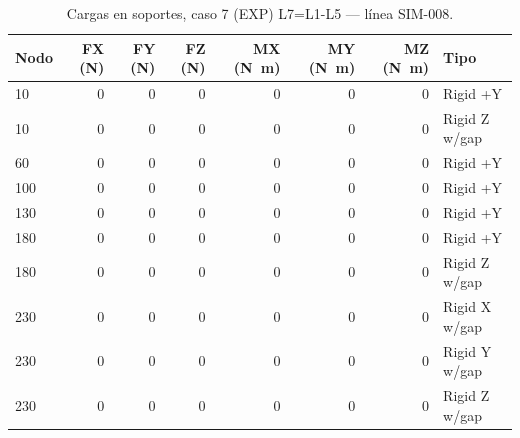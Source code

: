 \begin{table}[htbp]
  \centering
  \footnotesize
  \caption{Cargas en soportes, caso 7 (EXP) L7=L1-L5 — línea SIM-008.}
  \label{tab:restricciones-exp}
  \begin{tabular}{lrrrrrrl}
    \toprule
    Nodo & FX (\si{N}) & FY (\si{N}) & FZ (\si{N}) & MX (\si{N.m}) & MY (\si{N.m}) & MZ (\si{N.m}) & Tipo \\
    \midrule
    10 & \num{0} & \num{0} & \num{0} & \num{0} & \num{0} & \num{0} & Rigid +Y \\
    10 & \num{0} & \num{0} & \num{0} & \num{0} & \num{0} & \num{0} & Rigid Z w/gap \\
    60 & \num{0} & \num{0} & \num{0} & \num{0} & \num{0} & \num{0} & Rigid +Y \\
    100 & \num{0} & \num{0} & \num{0} & \num{0} & \num{0} & \num{0} & Rigid +Y \\
    130 & \num{0} & \num{0} & \num{0} & \num{0} & \num{0} & \num{0} & Rigid +Y \\
    180 & \num{0} & \num{0} & \num{0} & \num{0} & \num{0} & \num{0} & Rigid +Y \\
    180 & \num{0} & \num{0} & \num{0} & \num{0} & \num{0} & \num{0} & Rigid Z w/gap \\
    230 & \num{0} & \num{0} & \num{0} & \num{0} & \num{0} & \num{0} & Rigid X w/gap \\
    230 & \num{0} & \num{0} & \num{0} & \num{0} & \num{0} & \num{0} & Rigid Y w/gap \\
    230 & \num{0} & \num{0} & \num{0} & \num{0} & \num{0} & \num{0} & Rigid Z w/gap \\
    \bottomrule
  \end{tabular}
\end{table}
